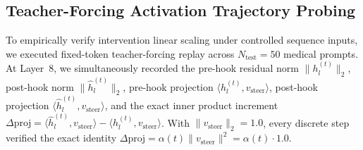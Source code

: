 \documentclass[conference]{IEEEtran}
\begin{document}
\subsection{Teacher-Forcing Activation Trajectory Probing}
\label{sec:activation_trajectories}
To empirically verify intervention linear scaling under controlled sequence inputs, we executed fixed-token teacher-forcing replay across $N_{\text{test}}=50$ medical prompts. At Layer~8, we simultaneously recorded the pre-hook residual norm $\|h_l^{(t)}\|_2$, post-hook norm $\|\hat{h}_l^{(t)}\|_2$, pre-hook projection $\langle h_l^{(t)}, v_{\text{steer}} \rangle$, post-hook projection $\langle \hat{h}_l^{(t)}, v_{\text{steer}} \rangle$, and the exact inner product increment $\Delta \text{proj} = \langle \hat{h}_l^{(t)}, v_{\text{steer}} \rangle - \langle h_l^{(t)}, v_{\text{steer}} \rangle$. With $\|v_{\text{steer}}\|_2 = 1.0$, every discrete step verified the exact identity $\Delta \text{proj} = \alpha(t) \|v_{\text{steer}}\|^2 = \alpha(t) \cdot 1.0$.
\end{document}
